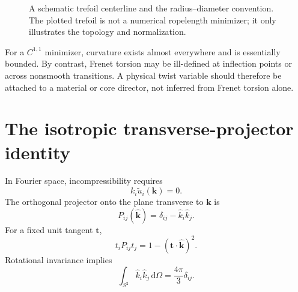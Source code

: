 \documentclass[aps,pre,preprint,notitlepage,nofootinbib,superscriptaddress]{revtex4-2}
\newcommand{\dd}{\mathrm d}
\newcommand{\Rop}{\operatorname{Rop}}
\newcommand{\calL}{\mathcal L}
\newcommand{\unitvec}[1]{\widehat{\bm #1}}
\begin{document}
\begin{figure}[t]
\caption{A schematic trefoil centerline and the radius--diameter convention.  The plotted trefoil is not a numerical ropelength minimizer; it only illustrates the topology and normalization.}
\label{fig:trefoil-convention}
\end{figure}

For a $C^{1,1}$ minimizer, curvature exists almost everywhere and is essentially bounded.  By contrast, Frenet torsion may be ill-defined at inflection points or across nonsmooth transitions.  A physical twist variable should therefore be attached to a material or core director, not inferred from Frenet torsion alone.

\section{The isotropic transverse-projector identity}
\label{sec:projector}

In Fourier space, incompressibility requires
\begin{equation}
  k_i\widetilde u_i(\bm k)=0.
\end{equation}
The orthogonal projector onto the plane transverse to $\bm k$ is
\begin{equation}
  P_{ij}(\unitvec{k})=\delta_{ij}-\widehat k_i\widehat k_j.
  \label{eq:projector}
\end{equation}
For a fixed unit tangent $\bm t$,
\begin{equation}
  t_iP_{ij}t_j=1-(\bm t\cdot\unitvec{k})^2.
\end{equation}
Rotational invariance implies
\begin{equation}
  \int_{S^2}\widehat k_i\widehat k_j\,\dd\Omega
  =\frac{4\pi}{3}\delta_{ij}.
  \label{eq:isotropic-second-moment}
\end{equation}
\end{document}
